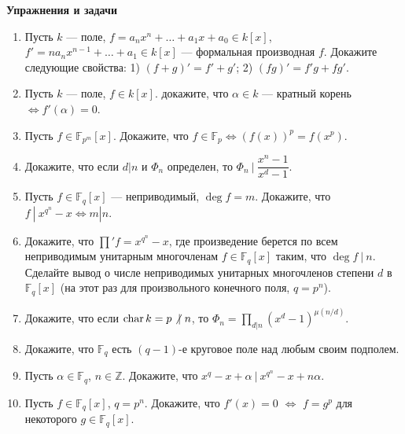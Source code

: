 \noindent\textbf{Упражнения и задачи}
\begin{enumerate}[topsep=0pt]
    \item Пусть $k$ --- поле, $f=a_nx^n+\dots+a_1x+a_0 \in k[x]$, $f'=n a_n x^{n-1}+\dots+a_1 \in k[x]$ --- формальная производная $f$. Докажите следующие свойства: 1) $(f+g)'=f'+g'$; 2) $(fg)'=f'g+fg'$.

    \item Пусть $k$ --- поле, $f \in k[x]$. докажите, что $\alpha \in k$ --- кратный корень $\Leftrightarrow f'(\alpha) = 0$.

    \item Пусть $f \in \mathbb{F}_{p^m}[x]$. Докажите, что $f\in \mathbb{F}_{p} \Leftrightarrow (f(x))^p=f(x^p)$.

    \item Докажите, что если $d|n$ и $\Phi_n$ определен, то $\Phi_n\ |\ \dfrac{x^n-1}{x^d-1}$.

    \item Пусть $f \in \mathbb{F}_q[x]$ --- неприводимый, $\deg f = m$. Докажите, что $f\ |\ x^{q^n}-x \Leftrightarrow m|n$.

    \item Докажите, что $\prod' f = x^{q^n}-x$, где произведение берется по всем неприводимым унитарным многочленам $f\in \mathbb{F}_q[x]$ таким, что $\deg f\ |\ n$. Сделайте вывод о числе неприводимых унитарных многочленов степени $d$ в $\mathbb{F}_q[x]$ (на этот раз для произвольного конечного поля, $q=p^n$).

    \item Докажите, что если $\chr k = p \not{|}\ n$, то $\Phi_n = \prod\limits_{d|n}(x^d-1)^{\mu(n/d)}$.
    
    \item Докажите, что $\mathbb{F}_q$ есть $(q-1)$-е круговое поле над любым своим подполем. %


    \item Пусть $\alpha \in \mathbb{F}_q$, $n \in \mathbb{Z}$. Докажите, что $x^q-x+\alpha\ |\ x^{q^n}-x+n\alpha$. %

    \item Пусть $f \in \mathbb{F}_q[x]$, $q=p^n$. Докажите, что $f'(x)=0$ $\Leftrightarrow$ $f=g^p$ для некоторого $g \in \mathbb{F}_q[x]$. %
    

\end{enumerate}
